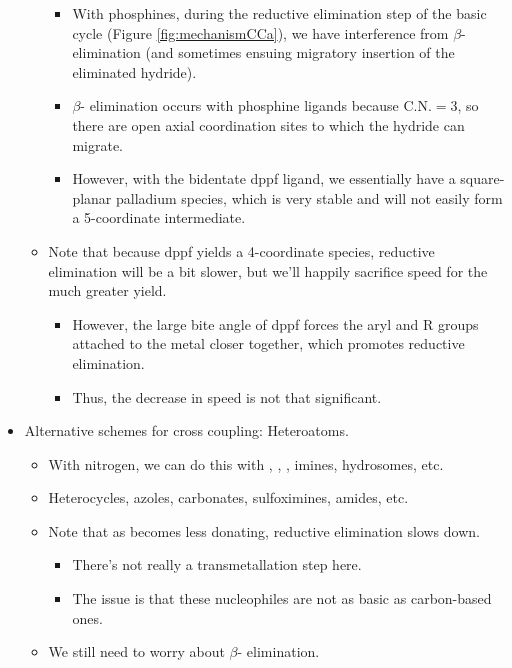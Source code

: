 \documentclass[../notes.tex]{subfiles}
\begin{document}
\begin{itemize}
\begin{itemize}
        \begin{itemize}
            \item With phosphines, during the reductive elimination step of the basic cycle (Figure \ref{fig:mechanismCCa}), we have interference from $\beta$- elimination (and sometimes ensuing migratory insertion of the eliminated hydride).
            \item $\beta$- elimination occurs with phosphine ligands because $\text{C.N.}=3$, so there are open axial coordination sites to which the hydride can migrate.
            \item However, with the bidentate dppf ligand, we essentially have a square-planar palladium species, which is very stable and will not easily form a 5-coordinate intermediate.
        \end{itemize}
        \item Note that because dppf yields a 4-coordinate species, reductive elimination will be a bit slower, but we'll happily sacrifice speed for the much greater yield.
        \begin{itemize}
            \item However, the large bite angle of dppf forces the aryl and R groups attached to the metal closer together, which promotes reductive elimination.
            \item Thus, the decrease in speed is not that significant.
        \end{itemize}
    \end{itemize}
    \item Alternative schemes for cross coupling: Heteroatoms.
    \begin{itemize}
        \item With nitrogen, we can do this with , , , imines, hydrosomes, etc.
        \item Heterocycles, azoles, carbonates, sulfoximines, amides, etc.
        \item Note that as  becomes less donating, reductive elimination slows down.
        \begin{itemize}
            \item There's not really a transmetallation step here.
            \item The issue is that these nucleophiles are not as basic as carbon-based ones.
        \end{itemize}
        \item We still need to worry about $\beta$- elimination.

\end{itemize}
\end{itemize}
\end{document}
